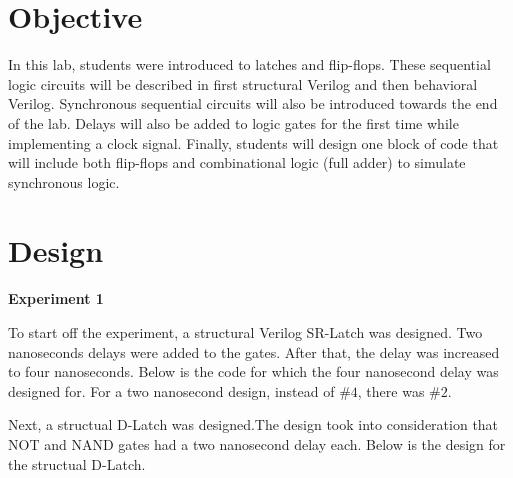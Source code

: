 \documentclass[a4paper,12pt]{article}
\date{\today}
\begin{document}
\section*{Objective}

  \hspace{15pt}In this lab, students were introduced to latches and flip-flops. These sequential logic
  circuits will be described in first structural Verilog and then behavioral Verilog.
  Synchronous sequential circuits will also be introduced towards the end of the lab.
  Delays will also be added to logic gates for the first time while implementing a
  clock signal. Finally, students will design one block of code that will include
  both flip-flops and combinational logic (full adder) to simulate synchronous logic.

\section*{Design}

%
%
%
%
%
%
%
%
%
%

%
%
%
%
%
%
%
%
%
%
%
%

  \textbf{Experiment 1}
  
  To start off the experiment, a structural Verilog SR-Latch was designed. Two nanoseconds
  delays were added to the gates. After that, the delay was increased to four nanoseconds.
  Below is the code for which the four nanosecond delay was designed for. For a two
  nanosecond design, instead of \#$4$, there was \#$2$.
  
  
  
  Next, a structual D-Latch was designed.The design took into consideration that NOT and
  NAND gates had a two nanosecond delay each. Below is the design for the structual 
  D-Latch.
\end{document}
